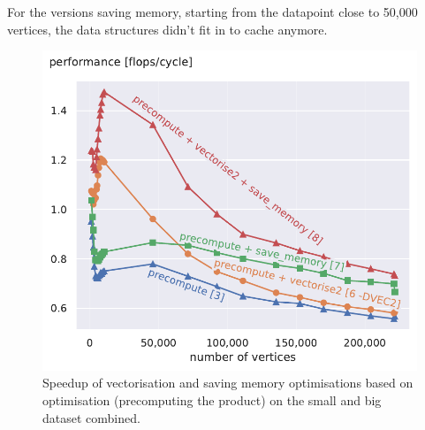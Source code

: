 \documentclass[letterpaper]{article}
\begin{document}
For the versions saving memory, starting from the datapoint close to 50,000 vertices, the data structures didn't fit in to cache anymore.
\begin{figure}\centering
	\includegraphics[scale=0.59]{img/performance[3][6][7][8]_both.pdf}
	\caption{Speedup of vectorisation and saving memory optimisations based on optimisation  (precomputing the product) on the small and big dataset combined. \label{cpctVectPerformanceBoth}}
\end{figure}
\end{document}
